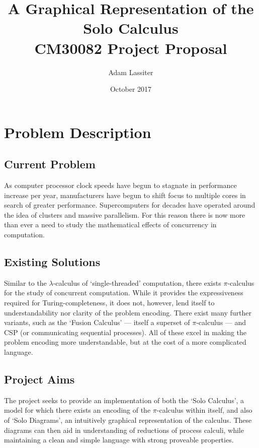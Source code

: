 \documentclass{article}
\title{A Graphical Representation of the Solo Calculus \\
	\large CM30082 Project Proposal}
\author{Adam Lassiter}
\date{October 2017}
\begin{document}
\maketitle

\vfill

\tableofcontents

\pagebreak


\section{Problem Description}
\subsection{Current Problem}
As computer processor clock speeds have begun to stagnate in performance increase per year, manufacturers have begun to shift focus to multiple cores in search of greater performance. Supercomputers for decades have operated around the idea of clusters and massive parallelism. For this reason there is now more than ever a need to study the mathematical effects of concurrency in computation.

\subsection{Existing Solutions}
Similar to the $\lambda$-calculus of `single-threaded' computation, there exists $\pi$-calculus for the study of concurrent computation. While it provides the expressiveness required for Turing-completeness, it does not, however, lend itself to understandability nor clarity of the problem encoding.
There exist many further variants, such as the `Fusion Calculus' --- itself a superset of $\pi$-calculus --- and CSP (or communicating sequential processes). All of these excel in making the problem encoding more understandable, but at the cost of a more complicated language.

\subsection{Project Aims}
The project seeks to provide an implementation of both the `Solo Calculus', a model for which there exists an encoding of the $\pi$-calculus within itself, and also of `Solo Diagrams', an intuitively graphical representation of the calculus. These diagrams can then aid in understanding of reductions of process calculi, while maintaining a clean and simple language with strong proveable properties.
\end{document}
